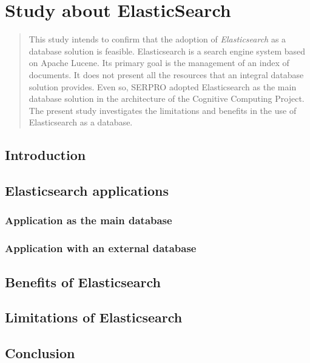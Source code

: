 \chapter{Study about ElasticSearch}
\label{chap:elasticsearch}

\begin{abstract}
	This study intends to confirm that the adoption of \textit{Elasticsearch} as a database solution is feasible. Elasticsearch is a search engine system based on Apache Lucene. Its primary goal is the management of an index of documents. It does not present all the resources that an integral database solution provides. Even so, SERPRO adopted Elasticsearch as the main database solution in the architecture of the Cognitive Computing Project. The present study investigates the limitations and benefits in the use of Elasticsearch as a database.
\end{abstract}

\section{Introduction}
\label{sec:intro}

\section{Elasticsearch applications}
\label{sec:applications}

\subsection{Application as the main database}
\label{sec:appmaindb}

\subsection{Application with an external database}
\label{sec:appexternaldb}

\section{Benefits of Elasticsearch}
\label{sec:benefits}

\section{Limitations of Elasticsearch}
\label{sec:limitations}

\section{Conclusion}
\label{sec:conclusion}